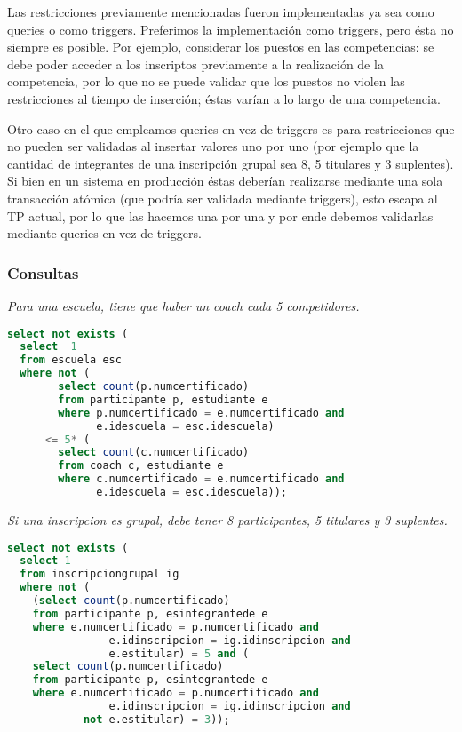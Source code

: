 \par Las restricciones previamente mencionadas fueron implementadas ya sea como queries o como triggers.
Preferimos la implementación como triggers, pero ésta no siempre es posible.
Por ejemplo, considerar los puestos en las competencias: se debe poder acceder a los inscriptos previamente a la realización de la competencia, por lo que no se puede validar que los puestos no violen las restricciones al tiempo de inserción; éstas varían a lo largo de una competencia.

\par Otro caso en el que empleamos queries en vez de triggers es para restricciones que no pueden ser validadas al insertar valores uno por uno (por ejemplo que la cantidad de integrantes de una inscripción grupal sea 8, 5 titulares y 3 suplentes).
Si bien en un sistema en producción éstas deberían realizarse mediante una sola transacción atómica (que podría ser validada mediante triggers), esto escapa al TP actual, por lo que las hacemos una por una y por ende debemos validarlas mediante queries en vez de triggers.


\subsubsection{Consultas}
\emph{Para una escuela, tiene que haber un coach cada 5 competidores.}

\begin{lstlisting}[language=SQL]
select not exists (
  select  1
  from escuela esc
  where not (
        select count(p.numcertificado)
        from participante p, estudiante e
        where p.numcertificado = e.numcertificado and
              e.idescuela = esc.idescuela)
      <= 5* (
        select count(c.numcertificado)
        from coach c, estudiante e
        where c.numcertificado = e.numcertificado and
              e.idescuela = esc.idescuela));
\end{lstlisting}

\emph{Si una inscripcion es grupal, debe tener 8 participantes, 5 titulares y 3 suplentes.}

\begin{lstlisting}[language=SQL]
select not exists (
  select 1
  from inscripciongrupal ig
  where not (
    (select count(p.numcertificado)
    from participante p, esintegrantede e
    where e.numcertificado = p.numcertificado and
                e.idinscripcion = ig.idinscripcion and
                e.estitular) = 5 and (
    select count(p.numcertificado)
    from participante p, esintegrantede e
    where e.numcertificado = p.numcertificado and
                e.idinscripcion = ig.idinscripcion and
	        not e.estitular) = 3));
\end{lstlisting}

